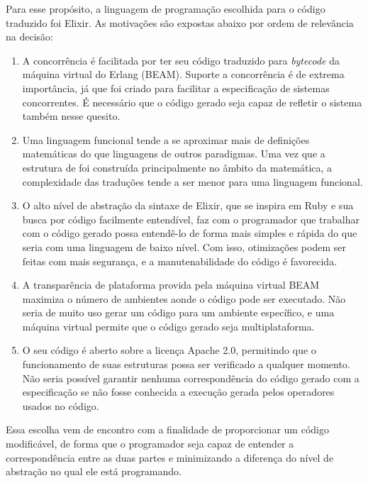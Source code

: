 Para esse propósito, a linguagem de programação escolhida para o código traduzido foi Elixir. As motivações são expostas abaixo por ordem de relevância na decisão:
\begin{enumerate}
  \item A concorrência é facilitada por ter seu código traduzido para \textit{bytecode} da máquina virtual do Erlang (BEAM). Suporte a concorrência é de extrema importância, já que \TLA foi criado para facilitar a especificação de sistemas concorrentes. É necessário que o código gerado seja capaz de refletir o sistema também nesse quesito.

  \item Uma linguagem funcional tende a se aproximar mais de definições matemáticas do que linguagens de outros paradigmas. Uma vez que a estrutura de \TLA foi construída principalmente no âmbito da matemática, a complexidade das traduções tende a ser menor para uma linguagem funcional.

  \item O alto nível de abstração da sintaxe de Elixir, que se inspira em Ruby e sua busca por código facilmente entendível, faz com o programador que trabalhar com o código gerado possa entendê-lo de forma mais simples e rápida do que seria com uma linguagem de baixo nível. Com isso, otimizações podem ser feitas com mais segurança, e a manutenabilidade do código é favorecida.

  \item A transparência de plataforma provida pela máquina virtual BEAM maximiza o número de ambientes aonde o código pode ser executado. Não seria de muito uso gerar um código para um ambiente específico, e uma máquina virtual permite que o código gerado seja multiplataforma.

  \item O seu código é aberto sobre a licença Apache 2.0, permitindo que o funcionamento de suas estruturas possa ser verificado a qualquer momento. Não seria possível garantir nenhuma correspondência do código gerado com a especificação se não fosse conhecida a execução gerada pelos operadores usados no código.

\end{enumerate}

Essa escolha vem de encontro com a finalidade de proporcionar um código modificável, de forma que o programador seja capaz de entender a correspondência entre as duas partes e minimizando a diferença do nível de abstração no qual ele está programando.

